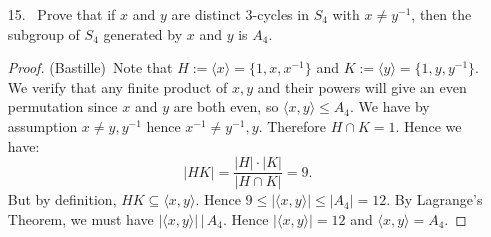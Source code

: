 \documentclass[10pt]{article}
\newcommand{\divides}{\, \Big | \,}
\newcommand{\la}{\langle}
\newcommand{\ra}{\rangle}
\newcommand\inv{^{-1}}
\begin{document}
\begin{itemize}
\item[15.] \ Prove that if $x$ and $y$ are distinct 3-cycles in $S_4$ with $x \neq y\inv$, then the subgroup of $S_4$ generated by $x$ and $y$ is $A_4$.

\begin{proof}(Bastille)\ Note that $H:=\la x \ra = \{1,x,x\inv \}$ and $K:=\la y \ra = \{1,y,y\inv \}$. We verify that any finite product of $x,y$ and their powers will give an even permutation since $x$ and $y$ are both even, so $\la x,y \ra \leq A_4$. We have by assumption $x \neq y,y\inv$ hence $x\inv \neq y\inv, y$. Therefore $H \cap K =1$. Hence we have:
\begin{equation*}
|HK|= \frac{|H|\cdot|K|}{|H \cap K|}=9.
\end{equation*}
But by definition, $ HK \subseteq \la x,y \ra$. Hence $9 \leq | \la
x,y \ra | \leq |A_4|=12$. By Lagrange's Theorem, we must have $|\la
x,y \ra| \divides A_4$. Hence $| \la x,y \ra | =12$ and $\la x,y
\ra=A_4$.
\end{proof}
\end{itemize}

 
\end{document}
